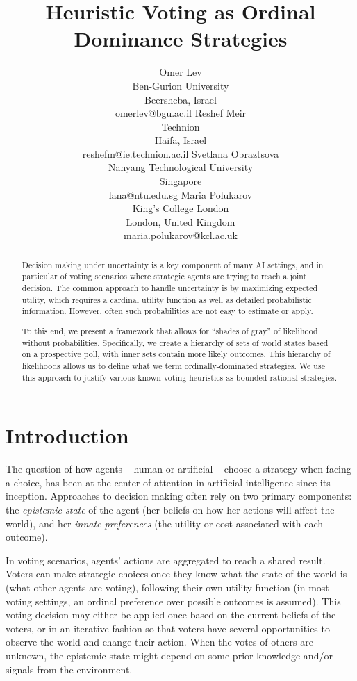 \documentclass[letterpaper]{article} %
\title{Heuristic Voting as Ordinal Dominance Strategies}
\author{
	Omer Lev\\Ben-Gurion University\\
	Beersheba, Israel\\ omerlev@bgu.ac.il
	\And
	Reshef Meir\\Technion\\Haifa, Israel\\ reshefm@ie.technion.ac.il
	\And
	Svetlana Obraztsova\\Nanyang Technological University\\Singapore\\lana@ntu.edu.sg
	\And
	Maria Polukarov\\King's College London\\London, United Kingdom\\maria.polukarov@kcl.ac.uk
	}
\begin{document}
\maketitle
\begin{abstract}
Decision making under uncertainty is a key component of many AI settings, and in particular of voting scenarios where strategic agents are trying to reach a joint decision. The common approach to handle uncertainty is by maximizing expected utility, which requires a cardinal utility function as well as detailed probabilistic information. However, often such probabilities are not easy to estimate or apply.

To this end, we present a framework that allows for ``shades of gray'' of likelihood without probabilities. Specifically, we create a hierarchy of sets of world states based on a prospective poll, with inner sets contain more likely outcomes. This hierarchy of likelihoods allows us to define what we term ordinally-dominated strategies. We use this approach to justify various known voting heuristics as bounded-rational strategies.
\end{abstract}


\section{Introduction}\label{sec:intro}

The question of how agents -- human or artificial -- choose a strategy when facing a choice, has been at the center of attention in artificial intelligence since its inception. Approaches to decision making often rely on two primary components: the \emph{epistemic state} of the agent (her beliefs on how her actions will affect the world), and her \emph{innate preferences} (the utility or cost associated with each outcome).

In voting scenarios, agents' actions are aggregated to reach a shared result. Voters can make strategic choices once they know what the state of the world is (what other agents are voting), following their own utility function (in most voting settings, an ordinal preference over possible outcomes is assumed). This voting decision may either be applied once based on the current beliefs of the voters, or in an iterative fashion so that voters have several opportunities to observe the world and change their action. When the votes of others are unknown, the epistemic state might depend on some prior knowledge and/or signals from the environment.
\end{document}
